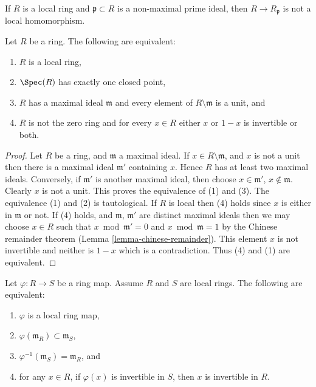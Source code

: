 \begin{example}
\label{example-not-local}
If $R$ is a local ring and $\mathfrak p \subset R$ is a non-maximal
prime ideal, then $R \to R_\mathfrak p$ is not a local homomorphism.
\end{example}

\begin{lemma}
\label{lemma-characterize-local-ring}
Let $R$ be a ring. The following are equivalent:
\begin{enumerate}
\item $R$ is a local ring,
\item $\Spec(R)$ has exactly one closed point,
\item $R$ has a maximal ideal $\mathfrak m$
and every element of $R \setminus \mathfrak m$
is a unit, and
\item $R$ is not the zero ring and for every $x \in R$ either $x$
or $1 - x$ is invertible or both.
\end{enumerate}
\end{lemma}

\begin{proof}
Let $R$ be a ring, and $\mathfrak m$ a maximal ideal.
If $x \in R \setminus \mathfrak m$, and $x$ is not a unit
then there is a maximal ideal $\mathfrak m'$ containing $x$.
Hence $R$ has at least two maximal ideals. Conversely,
if $\mathfrak m'$ is another maximal ideal, then choose
$x \in \mathfrak m'$, $x \not \in \mathfrak m$. Clearly
$x$ is not a unit. This proves the equivalence of (1) and (3).
The equivalence (1) and (2) is tautological.
If $R$ is local then (4) holds since $x$ is either in $\mathfrak m$
or not. If (4) holds, and $\mathfrak m$, $\mathfrak m'$ are distinct
maximal ideals then we may choose $x \in R$ such that
$x \bmod \mathfrak m' = 0$ and $x \bmod \mathfrak m = 1$
by the Chinese remainder theorem
(Lemma \ref{lemma-chinese-remainder}).
This element $x$ is not invertible and neither is $1 - x$ which is
a contradiction. Thus (4) and (1) are equivalent.
\end{proof}

\begin{lemma}
\label{lemma-characterize-local-ring-map}
Let $\varphi : R \to S$ be a ring map. Assume $R$ and $S$ are local rings.
The following are equivalent:
\begin{enumerate}
\item $\varphi$ is a local ring map,
\item $\varphi(\mathfrak m_R) \subset \mathfrak m_S$,
\item $\varphi^{-1}(\mathfrak m_S) = \mathfrak m_R$, and
\item for any $x \in R$, if $\varphi(x)$ is invertible in $S$, then $x$
is invertible in $R$.
\end{enumerate}
\end{lemma}

